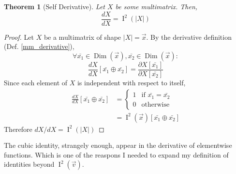 \documentclass[12pt]{book}
\theoremstyle{plain}
\newtheorem{theorem}{Theorem}[chapter]
\theoremstyle{definition}
\theoremstyle{ppart}
\theoremstyle{case}
\theoremstyle{solution}
\DeclareMathOperator{\Dim}{Dim}
\DeclareMathOperator{\Ident}{I}
\newcommand{\shape}[1]{\left|#1\right|}
\begin{document}
\begin{theorem}[Self Derivative]
\label{self_derivative}
Let $X$ be some multimatrix. Then,
\[ \frac{dX}{dX} = \Ident^2(\shape{X}) \]
\end{theorem}
\begin{proof}
Let $X$ be a multimatrix of shape $\shape{X}=\vec{x}$.
By the derivative definition (Def. \ref{mm_derivative}),
\[
 \forall \bar{x_1} \in \Dim(\vec{x}),
         \bar{x_2} \in \Dim(\vec{x}):
\]
\[
 \frac{dX}{dX}[\bar{x_1} \oplus \bar{x_2}] = 
 \frac{\partial X[\bar{x_1}]}{\partial X[\bar{x_2}]}
\]
Since each element of $X$ is independent with respect to itself,
\begin{align*}
 \frac{dX}{dX}[\bar{x_1} \oplus \bar{x_2}]
 &= \left\{
  \begin{array}{ll}
    1 & \mbox{if } \bar{x_1} = \bar{x_2} \\
    0 & \mbox{otherwise}
  \end{array}
 \right. \\
 &= \Ident^2(\vec{x})[\bar{x_1} \oplus \bar{x_2}]
\end{align*}
Therefore $dX/dX = \Ident^2(\shape{X})$
\end{proof}

The cubic identity, strangely enough, appear in the derivative of elementwise
functions. Which is one of the reaspons I needed to expand my definition of
identities beyond $\Ident^2(\vec{v})$.
\end{document}
